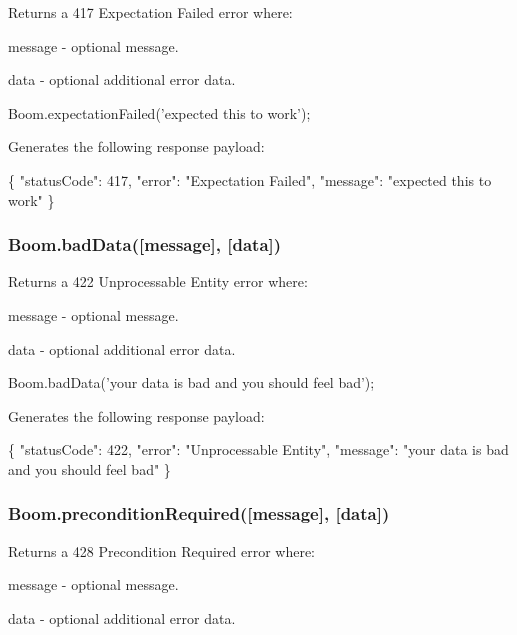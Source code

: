 Returns a 417 Expectation Failed error where\+:
\begin{DoxyItemize}
\item {\ttfamily message} -\/ optional message.
\item {\ttfamily data} -\/ optional additional error data.
\end{DoxyItemize}


\begin{DoxyCode}
Boom.expectationFailed('expected this to work');
\end{DoxyCode}


Generates the following response payload\+:


\begin{DoxyCode}
\{
    "statusCode": 417,
    "error": "Expectation Failed",
    "message": "expected this to work"
\}
\end{DoxyCode}


\subsubsection*{{\ttfamily Boom.\+bad\+Data(\mbox{[}message\mbox{]}, \mbox{[}data\mbox{]})}}

Returns a 422 Unprocessable Entity error where\+:
\begin{DoxyItemize}
\item {\ttfamily message} -\/ optional message.
\item {\ttfamily data} -\/ optional additional error data.
\end{DoxyItemize}


\begin{DoxyCode}
Boom.badData('your data is bad and you should feel bad');
\end{DoxyCode}


Generates the following response payload\+:


\begin{DoxyCode}
\{
    "statusCode": 422,
    "error": "Unprocessable Entity",
    "message": "your data is bad and you should feel bad"
\}
\end{DoxyCode}


\subsubsection*{{\ttfamily Boom.\+precondition\+Required(\mbox{[}message\mbox{]}, \mbox{[}data\mbox{]})}}

Returns a 428 Precondition Required error where\+:
\begin{DoxyItemize}
\item {\ttfamily message} -\/ optional message.
\item {\ttfamily data} -\/ optional additional error data.
\end{DoxyItemize}


